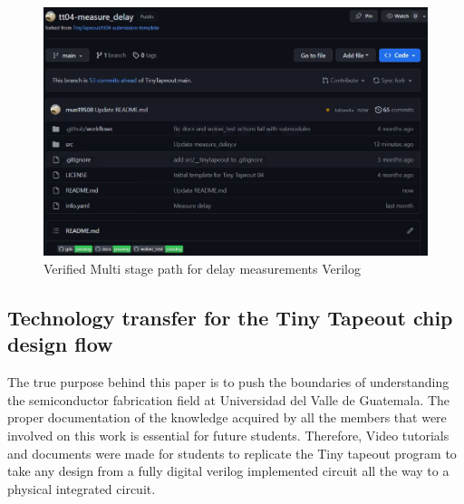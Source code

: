 \begin{figure}[H]
    \centering
    \includegraphics[width=\linewidth]{Pictures/delay ver.png}
    \caption{Verified Multi stage path for delay measurements Verilog}
    \label{fig:enter-label}
\end{figure}

\subsection{Technology transfer for the Tiny Tapeout chip design flow}

The true purpose behind this paper is to push the boundaries of understanding the semiconductor fabrication field at Universidad del Valle de Guatemala. The proper documentation of the knowledge acquired by all the members that were involved on this work is essential for future students. Therefore, Video tutorials and documents were made for students to replicate the Tiny tapeout program to take any design from a fully digital verilog implemented circuit all the way to a physical integrated circuit. 

